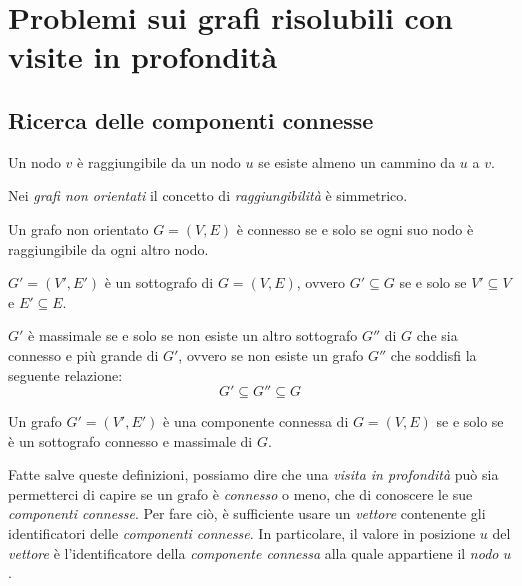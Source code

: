 \section{Problemi sui grafi risolubili con visite in profondità}
\subsection{Ricerca delle componenti connesse}
\begin{definition}[Raggiungibilità]
    Un nodo $v$ è raggiungibile da un nodo $u$ se esiste almeno un cammino da
    $u$ a $v$.
\end{definition}
\begin{note}
    Nei \emph{grafi non orientati} il concetto di \emph{raggiungibilità} è
    simmetrico.
\end{note}
\begin{definition}
    Un grafo non orientato $G=(V,E)$ è connesso se e solo se ogni suo nodo
    è raggiungibile da ogni altro nodo.
\end{definition}
\begin{definition}[Sottografo]
    $G'=(V',E')$ è un sottografo di $G=(V,E)$, ovvero $G'\subseteq G$ se e solo
    se $V'\subseteq V$ e $E'\subseteq E$.
\end{definition}
\begin{definition}
    $G'$ è massimale se e solo se non esiste un altro sottografo $G''$ di $G$
    che sia connesso e più grande di $G'$, ovvero se non esiste un grafo $G''$
    che soddisfi la seguente relazione:
    \[G'\subseteq G''\subseteq G\]
\end{definition}
\begin{definition}
    Un grafo $G'=(V', E')$ è una componente connessa di $G=(V,E)$ se e solo se
    è un sottografo connesso e massimale di $G$.
\end{definition}\noindent
Fatte salve queste definizioni, possiamo dire che una \emph{visita in profondità}
può sia permetterci di capire se un grafo è \emph{connesso} o meno, che di
conoscere le sue \emph{componenti connesse}. Per fare ciò, è sufficiente usare
un \emph{vettore} contenente gli identificatori delle \emph{componenti connesse}.
In particolare, il valore in posizione $u$ del \emph{vettore} è l'identificatore
della \emph{componente connessa} alla quale appartiene il \emph{nodo} $u$.


